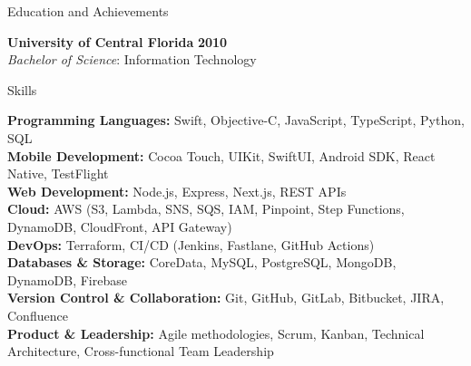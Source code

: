 \documentclass{resume} %
\begin{document}

\begin{rSection}{Education and Achievements}

    {\bf University of Central Florida} \hfill {\bf 2010} \\ 
    {\it Bachelor of Science}: Information Technology \\


\end{rSection}




\begin{rSection}{Skills}

    \textbf{Programming Languages:} Swift, Objective-C, JavaScript, TypeScript, Python, SQL \\
    \textbf{Mobile Development:} Cocoa Touch, UIKit, SwiftUI, Android SDK, React Native, TestFlight \\
    \textbf{Web Development:} Node.js, Express, Next.js, REST APIs \\
    \textbf{Cloud:} AWS (S3, Lambda, SNS, SQS, IAM, Pinpoint, Step Functions, DynamoDB, CloudFront, API Gateway) \\
    \textbf{DevOps:} Terraform, CI/CD (Jenkins, Fastlane, GitHub Actions)     \\
    \textbf{Databases \& Storage:} CoreData, MySQL, PostgreSQL, MongoDB, DynamoDB, Firebase   \\
    \textbf{Version Control \& Collaboration:} Git, GitHub, GitLab, Bitbucket, JIRA, Confluence   \\
    \textbf{Product \& Leadership:} Agile methodologies, Scrum, Kanban, Technical Architecture, Cross-functional Team Leadership 

\end{rSection}
\end{document}

